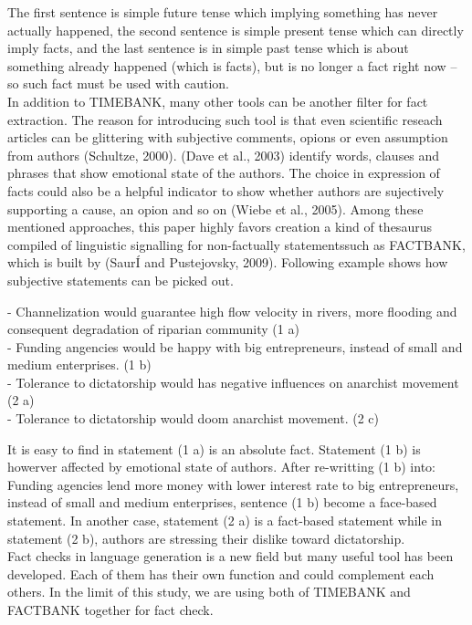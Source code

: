 The first sentence is simple future tense which implying something has never actually happened, the second sentence is simple present tense which can directly imply facts, and the last sentence is in simple past tense which is about something already happened (which is facts), but is no longer a fact right now -- so such fact must be used with caution. \\

In addition to TIMEBANK, many other tools can be another filter for fact extraction. The reason for introducing such tool is that even scientific reseach articles can be glittering with subjective comments, opions or even assumption from authors (Schultze, 2000). (Dave et al., 2003) identify words, clauses and phrases that show emotional state of the authors. The choice in expression of facts could also be a helpful indicator to show whether authors are sujectively supporting a cause, an opion and so on (Wiebe et al., 2005). Among these mentioned approaches, this paper highly favors creation a kind of thesaurus compiled of linguistic signalling for non-factually statementssuch as FACTBANK, which is built by (Saur\'{I} and Pustejovsky, 2009). Following example shows how subjective statements can be picked out.\\
\noindent
\begin{flushleft}
	   -   Channelization would guarantee high flow velocity in rivers, more flooding and consequent degradation of riparian community (1 a)\\
	   -	Funding angencies would be happy with big entrepreneurs, instead of small and medium enterprises. (1 b)\\
	   -	Tolerance to dictatorship would has negative influences on anarchist movement (2 a)\\
	   -	Tolerance to dictatorship would doom anarchist movement. (2 c)\\
\end{flushleft}

It is easy to find in statement (1 a) is an absolute fact. Statement (1 b) is howerver affected by emotional state of authors. After re-writting (1 b) into: Funding agencies lend more money with lower interest rate to big entrepreneurs, instead of small and medium enterprises, sentence (1 b) become a face-based statement. In another case, statement (2 a) is a fact-based statement while in statement (2 b), authors are stressing their dislike toward dictatorship.\\
Fact checks in language generation is a new field but many useful tool has been developed. Each of them has their own function and could complement each others. In the limit of this study, we are using both of TIMEBANK and FACTBANK together for fact check. \\

